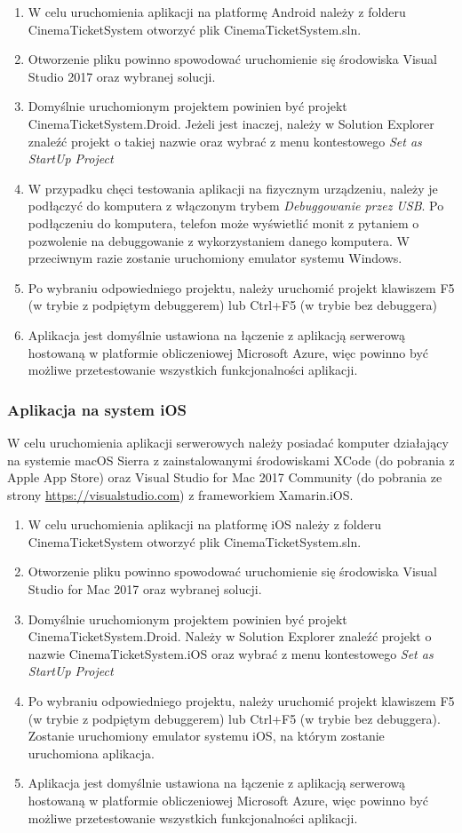 \begin{enumerate}
\item W celu uruchomienia aplikacji na platformę Android należy z folderu CinemaTicketSystem otworzyć plik CinemaTicketSystem.sln.
\item Otworzenie pliku powinno spowodować uruchomienie się środowiska Visual Studio 2017 oraz wybranej solucji.
\item Domyślnie uruchomionym projektem powinien być projekt CinemaTicketSystem.Droid. Jeżeli jest inaczej, należy w Solution Explorer znaleźć projekt o takiej nazwie oraz wybrać z menu kontestowego \textit{Set as StartUp Project}
\item W przypadku chęci testowania aplikacji na fizycznym urządzeniu, należy je podłączyć do komputera z włączonym trybem \textit{Debuggowanie przez USB}. Po podłączeniu do komputera, telefon może wyświetlić monit z pytaniem o pozwolenie na debuggowanie z wykorzystaniem danego komputera. W przeciwnym razie zostanie uruchomiony emulator systemu Windows.
\item Po wybraniu odpowiedniego projektu, należy uruchomić projekt klawiszem F5 (w trybie z podpiętym debuggerem) lub Ctrl+F5 (w trybie bez debuggera)
\item Aplikacja jest domyślnie ustawiona na łączenie z aplikacją serwerową hostowaną w platformie obliczeniowej Microsoft Azure, więc powinno być możliwe przetestowanie wszystkich funkcjonalności aplikacji.
\end{enumerate}
\subsubsection*{Aplikacja na system iOS}
W celu uruchomienia aplikacji serwerowych należy posiadać komputer działający na systemie macOS Sierra z zainstalowanymi środowiskami XCode (do pobrania z Apple App Store) oraz Visual Studio for Mac 2017 Community (do pobrania ze strony \url{https://visualstudio.com}) z frameworkiem Xamarin.iOS.

\begin{enumerate}
\item W celu uruchomienia aplikacji na platformę iOS należy z folderu CinemaTicketSystem otworzyć plik CinemaTicketSystem.sln.
\item Otworzenie pliku powinno spowodować uruchomienie się środowiska Visual Studio for Mac 2017 oraz wybranej solucji.
\item Domyślnie uruchomionym projektem powinien być projekt CinemaTicketSystem.Droid. Należy w Solution Explorer znaleźć projekt o nazwie CinemaTicketSystem.iOS oraz wybrać z menu kontestowego \textit{Set as StartUp Project}
\item Po wybraniu odpowiedniego projektu, należy uruchomić projekt klawiszem F5 (w trybie z podpiętym debuggerem) lub Ctrl+F5 (w trybie bez debuggera). Zostanie uruchomiony emulator systemu iOS, na którym zostanie uruchomiona aplikacja.
\item Aplikacja jest domyślnie ustawiona na łączenie z aplikacją serwerową hostowaną w platformie obliczeniowej Microsoft Azure, więc powinno być możliwe przetestowanie wszystkich funkcjonalności aplikacji.
\end{enumerate}